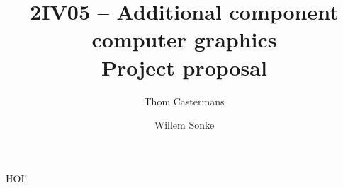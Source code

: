 \documentclass[a4paper,10pt]{article}
\title{2IV05 -- Additional component computer graphics \\ \textbf{Project proposal}}
\author{Thom Castermans \and Willem Sonke}
\begin{document}
\maketitle

HOI!
\end{document}
